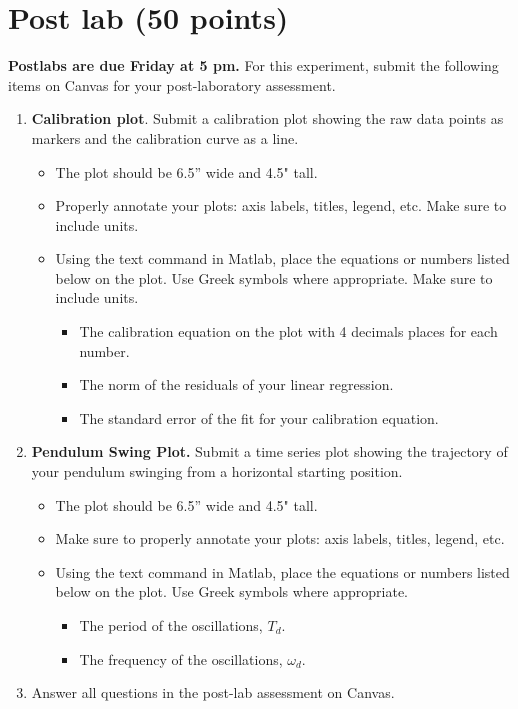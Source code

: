 \documentclass{article} %
\begin{document}
\clearpage

\clearpage
\section{Post lab (50 points)}
\textbf {Postlabs are due Friday at 5 pm.} For this experiment, submit the following items on Canvas for your post-laboratory assessment.
\begin{enumerate}
\item \textbf{Calibration plot}. Submit a calibration plot showing the raw data points as markers and the calibration curve as a line. 
\begin{itemize}
\item The plot should be 6.5” wide and 4.5" tall. 
\item Properly annotate your plots: axis labels, titles, legend, etc. Make sure to include units.
\item Using the text command in Matlab, place the equations or numbers listed below on the plot. Use Greek symbols where appropriate.  Make sure to include units. 
\begin{itemize}
    \item	The calibration equation on the plot with 4 decimals places for each number.
    \item	The norm of the residuals of your linear regression.
    \item	The standard error of the fit for your calibration equation.
\end{itemize}
\end{itemize}
\item \textbf{Pendulum Swing Plot.}  Submit a time series plot showing the trajectory of your pendulum swinging from a horizontal starting position. 
\begin{itemize}
    \item The plot should be 6.5” wide and 4.5" tall. 
    \item Make sure to properly annotate your plots: axis labels, titles, legend, etc.
    \item Using the text command in Matlab, place the equations or numbers listed below on the plot. Use Greek symbols where appropriate.
    \begin{itemize}
        \item	The period of the oscillations, $T_d$.
        \item The frequency of the oscillations, $\omega_d$.
    \end{itemize}
\end{itemize}
  

\item Answer all questions in the post-lab assessment on Canvas.
\end{enumerate}
\end{document}
